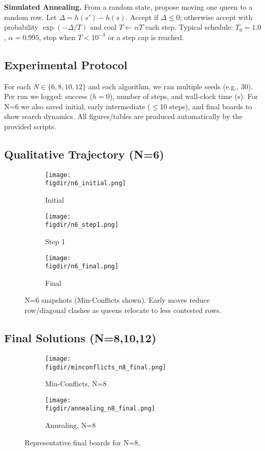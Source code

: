 \documentclass[11pt,a4paper]{article}
\newcommand{\figdir}{figures}
\begin{document}
\noindent\textbf{Simulated Annealing.} From a random state, propose moving one queen to a random row. Let $\Delta=h(s')-h(s)$. Accept if $\Delta\le0$; otherwise accept with probability $\exp(-\Delta/T)$ and cool $T\!\leftarrow\!\alpha T$ each step. Typical schedule: $T_0{=}1.0$, $\alpha{=}0.995$, stop when $T<10^{-3}$ or a step cap is reached.

\subsection{Experimental Protocol}
For each $N\in\{6,8,10,12\}$ and each algorithm, we ran multiple seeds (e.g., 30). Per run we logged: success ($h{=}0$), number of steps, and wall-clock time (s). For N=6 we also saved initial, early intermediate ($\le$10 steps), and final boards to show search dynamics. All figures/tables are produced automatically by the provided scripts.

\subsection{Qualitative Trajectory (N=6)}
\begin{figure}[H]\centering
  \begin{subfigure}{.31\linewidth}
    \texttt{[image: \\figdir/n6\_initial.png]}
    \caption{Initial}
  \end{subfigure}\hfill
  \begin{subfigure}{.31\linewidth}
    \texttt{[image: \\figdir/n6\_step1.png]}
    \caption{Step 1}
  \end{subfigure}\hfill
  \begin{subfigure}{.31\linewidth}
    \texttt{[image: \\figdir/n6\_final.png]}
    \caption{Final}
  \end{subfigure}
  \caption{N=6 snapshots (Min-Conflicts shown). Early moves reduce row/diagonal clashes as queens relocate to less contested rows.}
\end{figure}
\FloatBarrier

\subsection{Final Solutions (N=8,10,12)}
\begin{figure}[H]\centering
  \begin{subfigure}{.48\linewidth}
    \texttt{[image: \\figdir/minconflicts\_n8\_final.png]}
    \caption{Min-Conflicts, N=8}
  \end{subfigure}\hfill
  \begin{subfigure}{.48\linewidth}
    \texttt{[image: \\figdir/annealing\_n8\_final.png]}
    \caption{Annealing, N=8}
  \end{subfigure}
  \caption{Representative final boards for N=8.}
\end{figure}
\end{document}
